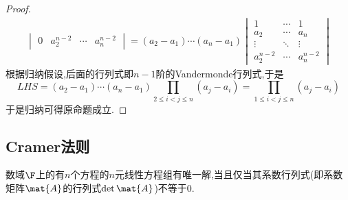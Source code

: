 \documentclass{ctexart}
\begin{document}
\begin{proof}
\[\begin{aligned}
\begin{vmatrix}
            0&a_2^{n-2}&\cdots&a_n^{n-2}
        \end{vmatrix}=\left(a_2-a_1\right)\cdots\left(a_n-a_1\right)\begin{vmatrix}
            1&\cdots&1\\
            a_2&\cdots&a_n\\
            \vdots&\ddots&\vdots\\
            a_2^{n-2}&\cdots&a_n^{n-2}
        \end{vmatrix}
    \end{aligned}\]
    根据归纳假设,后面的行列式即$n-1$阶的Vandermonde行列式,于是
    \[LHS=\left(a_2-a_1\right)\cdots\left(a_n-a_1\right)\prod_{2\leqslant i<j\leqslant n}\left(a_j-a_i\right)=\prod_{1\leqslant i<j\leqslant n}\left(a_j-a_i\right)\]
    于是归纳可得原命题成立.
\end{proof}
\subsection{Cramer法则}
\begin{theorem}
    数域$\F$上的有$n$个方程的$n$元线性方程组有唯一解,当且仅当其系数行列式(即系数矩阵$\mat{A}$的行列式$\det\mat{A}$)不等于$0$.
\end{theorem}
\end{document}
